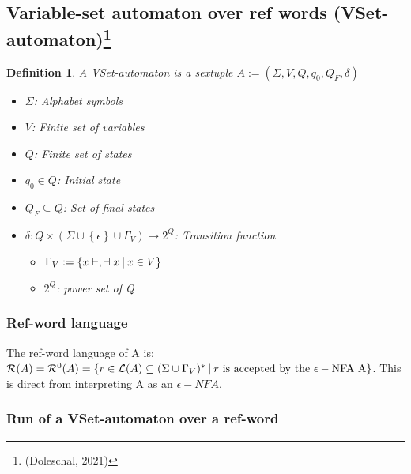 \documentclass{article}
\newcommand{\set}[1]{\left\{#1\right\}}
\newcommand{\st}{\ \vline \ }
\newcommand{\ra}{\rightarrow}
\newtheorem{definition}{Definition}
\begin{document}
\subsection*{Variable-set automaton over ref words (VSet-automaton)\footnote{(Doleschal, 2021)}}

\begin{definition}
A VSet-automaton is a sextuple $A:=(\Sigma, V, Q, q_0, Q_F,\delta)$
\begin{itemize}
    \item $\Sigma$: Alphabet symbols
    \item $V$: Finite set of variables
    \item $Q$: Finite set of states
    \item $q_0\in Q$: Initial state
    \item $Q_F\subseteq Q$: Set of final states
    \item $\delta: Q \times (\Sigma\cup\set{\epsilon}\cup\Gamma_V)\ra
          2^Q$: Transition function
        \begin{itemize}
            \item $\Gamma_V:=\set{x\vdash, \dashv x \st x \in V}$
            \item $2^Q$: power set of Q
        \end{itemize}
\end{itemize}
\end{definition}




\subsubsection*{Ref-word language}
The ref-word language of A is: $\mathcal{R}(A) = \mathcal{R}^0(A)
= \set{r \in \mathcal{L}(A)\subseteq(\Sigma\cup\Gamma_V)^*\st
r\mathrm{\ is\ accepted\ by\ the\ \epsilon-NFA\ A}}$. This is direct
from interpreting A as an $\epsilon-NFA$.

\subsubsection*{Run of a VSet-automaton over a ref-word}
\end{document}
